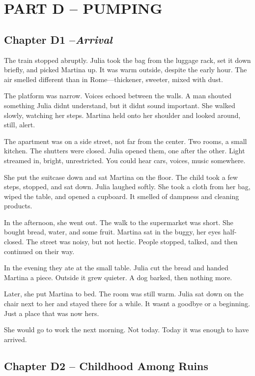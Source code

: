 \documentclass[
]{article}
\begin{document}
\section{PART D -- PUMPING}\label{part-d-pumping}

\subsection{\texorpdfstring{Chapter D1 --\emph{Arrival}}{Chapter D1 --Arrival}}\label{chapter-d1-arrival}

The train stopped abruptly. Julia took the bag from the luggage rack, set it down briefly, and picked Martina up. It was warm outside, despite the early hour. The air smelled different than in Rome---thickener, sweeter, mixed with dust.

The platform was narrow. Voices echoed between the walls. A man shouted something Julia didn\textquotesingle t understand, but it didn\textquotesingle t sound important. She walked slowly, watching her steps. Martina held onto her shoulder and looked around, still, alert.

The apartment was on a side street, not far from the center. Two rooms, a small kitchen. The shutters were closed. Julia opened them, one after the other. Light streamed in, bright, unrestricted. You could hear cars, voices, music somewhere.

She put the suitcase down and sat Martina on the floor. The child took a few steps, stopped, and sat down. Julia laughed softly. She took a cloth from her bag, wiped the table, and opened a cupboard. It smelled of dampness and cleaning products.

In the afternoon, she went out. The walk to the supermarket was short. She bought bread, water, and some fruit. Martina sat in the buggy, her eyes half-closed. The street was noisy, but not hectic. People stopped, talked, and then continued on their way.

In the evening they ate at the small table. Julia cut the bread and handed Martina a piece. Outside it grew quieter. A dog barked, then nothing more.

Later, she put Martina to bed. The room was still warm. Julia sat down on the chair next to her and stayed there for a while. It wasn\textquotesingle t a goodbye or a beginning. Just a place that was now hers.

She would go to work the next morning. Not today. Today it was enough to have arrived.

\subsection{Chapter D2 -- Childhood Among Ruins}\label{chapter-d2-childhood-among-ruins}
\end{document}

